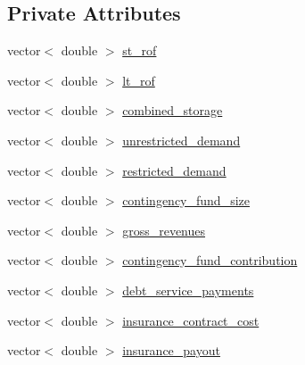 \subsection*{Private Attributes}
\begin{DoxyCompactItemize}
\item 
vector$<$ double $>$ \mbox{\hyperlink{classUtilitiesDataCollector_a48de294ec73e9d95c31d08316ca6620a_a48de294ec73e9d95c31d08316ca6620a}{st\+\_\+rof}}
\item 
vector$<$ double $>$ \mbox{\hyperlink{classUtilitiesDataCollector_ae573a427a96761529f3c33cafb2ae523_ae573a427a96761529f3c33cafb2ae523}{lt\+\_\+rof}}
\item 
vector$<$ double $>$ \mbox{\hyperlink{classUtilitiesDataCollector_ac5187dc598703630287ae17712f01b55_ac5187dc598703630287ae17712f01b55}{combined\+\_\+storage}}
\item 
vector$<$ double $>$ \mbox{\hyperlink{classUtilitiesDataCollector_adf6e8ba0fd80e4b2493916e15b7e369d_adf6e8ba0fd80e4b2493916e15b7e369d}{unrestricted\+\_\+demand}}
\item 
vector$<$ double $>$ \mbox{\hyperlink{classUtilitiesDataCollector_aa51e92337421be6412fb44b9ef0ea8d3_aa51e92337421be6412fb44b9ef0ea8d3}{restricted\+\_\+demand}}
\item 
vector$<$ double $>$ \mbox{\hyperlink{classUtilitiesDataCollector_af7a33a0752ac627955ab1898aa008639_af7a33a0752ac627955ab1898aa008639}{contingency\+\_\+fund\+\_\+size}}
\item 
vector$<$ double $>$ \mbox{\hyperlink{classUtilitiesDataCollector_ad107d45de75ad920142a6645f2657e5c_ad107d45de75ad920142a6645f2657e5c}{gross\+\_\+revenues}}
\item 
vector$<$ double $>$ \mbox{\hyperlink{classUtilitiesDataCollector_acf362c8f36ed94e85a7750111ee95275_acf362c8f36ed94e85a7750111ee95275}{contingency\+\_\+fund\+\_\+contribution}}
\item 
vector$<$ double $>$ \mbox{\hyperlink{classUtilitiesDataCollector_a04de6814b69ac521ac1533e4d7f5d6de_a04de6814b69ac521ac1533e4d7f5d6de}{debt\+\_\+service\+\_\+payments}}
\item 
vector$<$ double $>$ \mbox{\hyperlink{classUtilitiesDataCollector_a39b6a91decb12ef993f96a858d904afc_a39b6a91decb12ef993f96a858d904afc}{insurance\+\_\+contract\+\_\+cost}}
\item 
vector$<$ double $>$ \mbox{\hyperlink{classUtilitiesDataCollector_a0686118f05245bcef7c14f751dfc3534_a0686118f05245bcef7c14f751dfc3534}{insurance\+\_\+payout}}
\item 

\end{DoxyCompactItemize}
